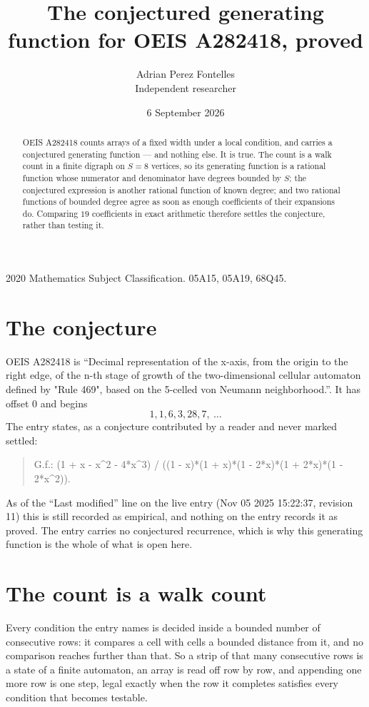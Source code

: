 \documentclass[11pt,a4paper]{article}
\title{The conjectured generating function for OEIS A282418, proved}
\author{Adrian Perez Fontelles\\ \small Independent researcher}
\date{6 September 2026}
\theoremstyle{plain}
\theoremstyle{definition}
\begin{document}
\maketitle

\begin{abstract}
OEIS A282418 counts arrays of a fixed width under a local condition, and carries a conjectured
generating function --- and nothing else. It is true. The count is a walk count in a finite
digraph on $S=8$ vertices, so its generating function is a rational function whose numerator
and denominator have degrees bounded by $S$; the conjectured expression is another rational
function of known degree; and two rational functions of bounded degree agree as soon as enough
coefficients of their expansions do. Comparing $19$ coefficients in exact arithmetic
therefore settles the conjecture, rather than testing it.
\end{abstract}

\noindent\small 2020 Mathematics Subject Classification. 05A15, 05A19, 68Q45.\normalsize

\section{The conjecture}

OEIS A282418 is ``Decimal representation of the x-axis, from the origin to the right edge, of the n-th stage of growth of the two-dimensional cellular automaton defined by "Rule 469", based on the 5-celled von Neumann neighborhood.''. It has offset $0$ and begins
\[
1, 1, 6, 3, 28, 7,\ \dots
\]
The entry states, as a conjecture contributed by a reader and never marked settled:
\begin{quote}
G.f.: (1 + x - x\^{}2 - 4*x\^{}3) / ((1 - x)*(1 + x)*(1 - 2*x)*(1 + 2*x)*(1 - 2*x\^{}2)).
\end{quote}
As of the ``Last modified'' line on the live entry (Nov 05 2025 15:22:37, revision 11) this is still
recorded as empirical, and nothing on the entry records it as proved. The entry carries no
conjectured recurrence, which is why this generating function is the whole of what is open
here.

\section{The count is a walk count}

Every condition the entry names is decided inside a bounded number of consecutive rows: it
compares a cell with cells a bounded distance from it, and no comparison reaches further than
that. So a strip of that many consecutive rows is a state of a finite automaton, an array is
read off row by row, and appending one more row is one step, legal exactly when the row it
completes satisfies every condition that becomes testable.
\end{document}

